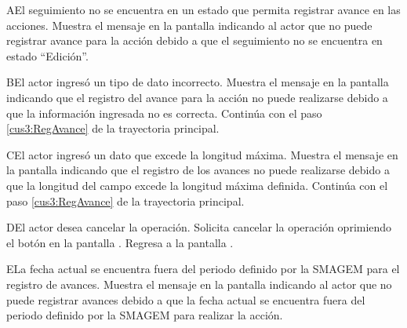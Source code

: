 \begin{UCtrayectoriaA}{A}{El seguimiento no se encuentra en un estado que permita registrar avance en las acciones.}
    \UCpaso[\UCsist] Muestra el mensaje  en la pantalla  indicando al actor que no puede registrar avance para la acción debido a que el seguimiento no se encuentra en estado ``Edición''. 
\end{UCtrayectoriaA}
 
    \begin{UCtrayectoriaA}{B}{El actor ingresó un tipo de dato incorrecto.}    
    \UCpaso[\UCsist] Muestra el mensaje  en la pantalla  indicando que el registro del avance para la acción no puede realizarse debido a que la información ingresada no es correcta.
    \UCpaso[] Continúa con el paso \ref{cus3:RegAvance} de la trayectoria principal.     
    \end{UCtrayectoriaA}
    
    \begin{UCtrayectoriaA}{C}{El actor ingresó un dato que excede la longitud máxima.}    
    \UCpaso[\UCsist] Muestra el mensaje  en la pantalla  indicando que el registro de los avances no puede realizarse debido a que la longitud del campo excede la longitud máxima definida.
    \UCpaso[] Continúa con el paso \ref{cus3:RegAvance} de la trayectoria principal.     
    \end{UCtrayectoriaA}
 
    \begin{UCtrayectoriaA}{D}{El actor desea cancelar la operación.}
      \UCpaso[\UCactor] Solicita cancelar la operación oprimiendo el botón  en la pantalla .
      \UCpaso[\UCsist] Regresa a la pantalla . 
    \end{UCtrayectoriaA}

    \begin{UCtrayectoriaA}{E}{La fecha actual se encuentra fuera del periodo definido por la SMAGEM para el registro de avances.}
    \UCpaso[\UCsist] Muestra el mensaje  en la pantalla  indicando al actor que no puede registrar avances debido a que la fecha actual se encuentra fuera del periodo definido por la SMAGEM para realizar la acción. 
    \end{UCtrayectoriaA}